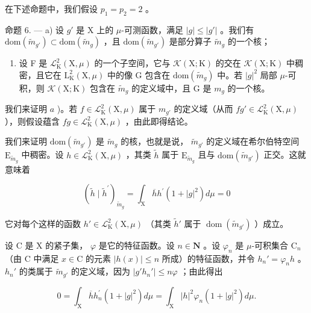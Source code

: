 在下述命题中，我们假设 \(p_1 = p_2 = 2\) 。

命题 6. --- a) 设 \(g'\) 是 X 上的 \(\mu\)-可测函数，满足 \(|g|\leqslant |g'|\) 。我们有 \(\mathrm{dom}(\widetilde{m}_{g'})\subset\mathrm{dom}(\widetilde{m}_{g})\) ，且 \(\mathrm{dom}(\widetilde{m}_{g'})\) 是部分算子 \(\widetilde{m}_{g}\) 的一个核；

\begin{enumerate}
\def\labelenumi{\alph{enumi})}
\setcounter{enumi}{1}
\tightlist
\item
  设 F 是 \(\mathcal{L}_{\mathrm{K}}^{2}(\mathrm{X},\mu)\) 的一个子空间，它与 \(\mathcal{K}(\mathrm{X};\mathrm{K})\) 的交在 \(\mathcal{K}(\mathrm{X};\mathrm{K})\) 中稠密，且它在 \(\mathrm{L}_{\mathrm{K}}^{2}(\mathrm{X},\mu)\) 中的像 G 包含在 \(\mathrm{dom}(\widetilde{m}_g)\) 中。若 \(|g|^2\) 局部 \(\mu\)-可积，则 \(\mathcal{K}(\mathrm{X};\mathrm{K})\) 包含在 \(\widetilde{m}_g\) 的定义域中，且 G 是 \(m_g\) 的一个核。
\end{enumerate}

我们来证明 \(a\) )。若 \(f \in \mathcal{L}_{\mathrm{K}}^{2}(\mathrm{X}, \mu)\) 属于 \(m_{g'}\) 的定义域（从而 \(fg' \in \mathcal{L}_{\mathrm{K}}^{2}(\mathrm{X}, \mu)\) ），则假设蕴含 \(fg \in \mathcal{L}_{\mathrm{K}}^{2}(\mathrm{X}, \mu)\) ，由此即得结论。

我们来证明 \(\mathrm{dom}(\widetilde{m}_{g'})\) 是 \(\widetilde{m}_g\) 的核，也就是说， \(\widetilde{m}_{g'}\) 的定义域在希尔伯特空间 \(\mathrm{E}_{\widetilde{m}_g}\) 中稠密。设 \(h \in \mathcal{L}_{\mathrm{K}}^2(\mathrm{X}, \mu)\) ，其类 \(\widetilde{h}\) 属于 \(\mathrm{E}_{\widetilde{m}_g}\) 且与 \(\mathrm{dom}(\widetilde{m}_{g'})\) 正交。这就意味着

\[
(\widetilde {h} \mid \widetilde {h} ^ {\prime}) _ {\widetilde {m} _ {g}} = \int_ {\mathrm{X}} \overline {{h}} h ^ {\prime} (1 + | g | ^ {2}) d \mu = 0
\]

它对每个这样的函数 \(h' \in \mathcal{L}_{\mathrm{K}}^{2}(\mathrm{X}, \mu)\) （其类 \(\widetilde{h}'\) 属于 \(\operatorname{dom}(\widetilde{m}_{g'})\) ）成立。

设 C 是 X 的紧子集， \(\varphi\) 是它的特征函数。设 \(n \in \mathbf{N}\) 。设 \(\varphi_n\) 是 \(\mu\)-可积集合 \(\mathrm{C}_n\) （由 C 中满足 \(x \in \mathrm{C}\) 的元素 \(|h(x)| \leqslant n\) 所成）的特征函数，并令 \(h_n' = \varphi_n h\) 。 \(h_n'\) 的类属于 \(\tilde{m}_{g'}\) 的定义域，因为 \(|g'h_n'| \leqslant n\varphi\) ；由此得出

\[
0 = \int_ {\mathrm{X}} \overline {{h}} h _ {n} ^ {\prime} (1 + | g | ^ {2}) d \mu = \int_ {\mathrm{X}} | h | ^ {2} \varphi_ {n} (1 + | g | ^ {2}) d \mu .
\]

